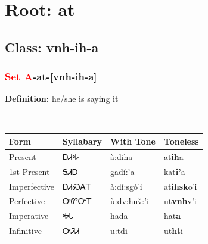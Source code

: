 \needspace{4in}
\section*{Root: at}
\nopagebreak
{}
\needspace{3in}
\subsection*{Class: vnh-ih-a}
\nopagebreak
\needspace{2in}
\subsubsection*{\textcolor{Red}{Set A}{-}\textbf{at}{-}[vnh-ih-a]}
\nopagebreak
\textbf{Definition: } he/she is saying it
\\[0.5em]
\begin{tabularx}{\textwidth}{l X X X}%
\toprule%
\textbf{Form}&\textbf{Syllabary}&\textbf{With Tone}&\textbf{Toneless}\\%
\midrule%
Present&ᎠᏗᎭ&à:diha&at\textbf{ih}a\\%
1st Present&ᎦᏗᎠ&gadí:’a&kat\textbf{i'}a\\%
Imperfective&ᎠᏗᏍᎪᎢ&à:dǐ:sgó’i&at\textbf{ihsk}o'i\\%
Perfective&ᎤᏛᏅᎢ&ù:dv:hnv̌:’i&ut\textbf{vnh}v'i\\%
Imperative&ᎭᏓ&hada&hat\textbf{a}\\%
Infinitive&ᎤᏘᏗ&u:tdi&ut\textbf{ht}i\\%
\bottomrule%
\end{tabularx}
\\[1em]